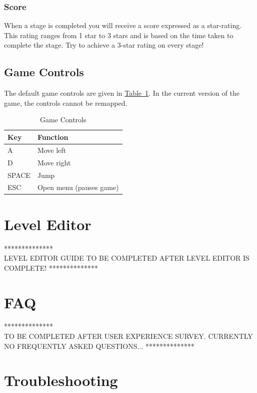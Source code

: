 \documentclass[12pt, titlepage]{article}
\begin{document}
\subsubsection{Score}
When a stage is completed you will receive a score expressed as a star-rating.  This rating ranges from 1 star to 3 stars and is based on the time taken to complete the stage.  Try to achieve a 3-star rating on every stage!


\subsection{Game Controls}
The default game controls are given in \hyperref[tab:ctrl]{Table~\ref*{tab:ctrl}}.  In the current version of the game, the controls cannot be remapped.


\begin{table}[H]
\caption{Game Controls} \label{tab:ctrl}
\centering
\begin{tabularx}{0.65\textwidth}{p{2.5cm}X}
\toprule {\bf Key} & {\bf Function}\\
\midrule
A & Move left\\
D & Move right\\
SPACE & Jump\\
ESC & Open menu (pauses game)\\
\bottomrule
\end{tabularx}
\end{table}

\section{Level Editor}
\label{sec:edit}
{\center ***************\\}
\noindent LEVEL EDITOR GUIDE TO BE COMPLETED AFTER LEVEL EDITOR IS COMPLETE!
{\center ***************\\}

\section{FAQ}
\label{sec:faq}
{\center ***************\\}
\noindent TO BE COMPLETED AFTER USER EXPERIENCE SURVEY.  CURRENTLY NO FREQUENTLY ASKED QUESTIONS...
{\center ***************\\}

\section{Troubleshooting}
\label{sec:trouble}
\end{document}
